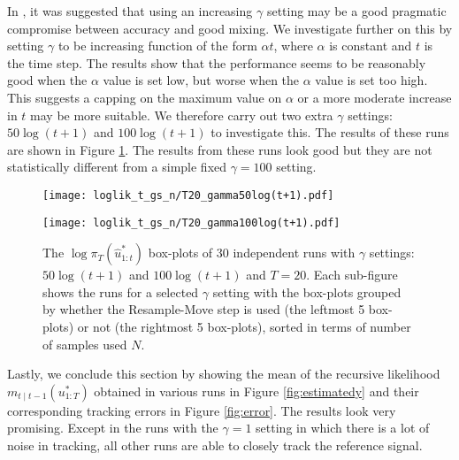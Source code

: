 In \cite{NK11}, it was suggested that using an increasing $\gamma$ setting may be a good pragmatic compromise between accuracy and good mixing. We investigate further on this by setting $\gamma$ to be increasing function of the form $\alpha t$, where $\alpha$ is constant and $t$ is the time step. The results show that the performance seems to be reasonably good when the $\alpha$ value is set low, but  worse when the $\alpha$ value is set too high. This suggests a capping on the maximum value on $\alpha$ or a more moderate increase in $t$ may be more suitable. We therefore carry out two extra $\gamma$ settings: $50\log(t+1)$ and $100\log(t+1)$ to investigate this. The results of these runs are shown in Figure \ref{fig:log}. The results from these runs look good but they are not statistically different from a simple fixed $\gamma=100$ setting.

\begin{figure}[!thbp]
    \centering
    \begin{minipage}{.5\textwidth}
        \centering
        \texttt{[image: loglik\_t\_gs\_n/T20\_gamma50log(t+1).pdf]}
    \end{minipage}%
    \begin{minipage}{0.5\textwidth}
        \centering
        \texttt{[image: loglik\_t\_gs\_n/T20\_gamma100log(t+1).pdf]}
    \end{minipage}
    \caption{The $\log\pi_T(\hat{u}^*_{1:t})$ box-plots of 30 independent runs with $\gamma$ settings: $50\log(t+1)$ and $100\log(t+1)$ and $T = 20$. Each sub-figure shows the runs for a selected $\gamma$ setting with the box-plots grouped by whether the Resample-Move step is used (the leftmost 5 box-plots) or not (the rightmost 5 box-plots), sorted in terms of number of samples used $N$.}
    \label{fig:log}
\end{figure}

Lastly, we conclude this section by showing the mean of the recursive likelihood $m_{t \mid t-1}(u^*_{1:T})$ obtained in various runs in Figure \ref{fig:estimatedy} and their corresponding tracking errors in Figure \ref{fig:error}. The results look very promising. Except in the runs with the $\gamma=1$ setting in which there is a lot of noise in tracking, all other runs are able to closely track the reference signal. 

